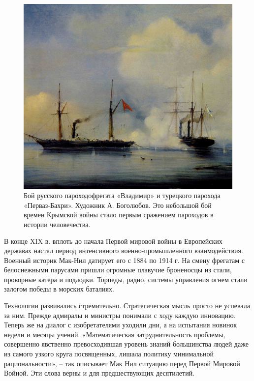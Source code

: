 \begin{figure}[h!tb] 
	\centering\includegraphics[scale=0.3]{Data/RYAV_sily_storon/rO3nWL7-ijc.jpg}
	\caption{Бой русского пароходофрегата «Владимир» и турецкого парохода «Перваз-Бахри». Художник А. Боголюбов. Это небольшой бой времен Крымской войны стало первым сражением пароходов в истории человечества.}%
\end{figure}

В конце XIX в. вплоть до начала Первой мировой войны в Европейских державах настал период интенсивного военно-промышленного взаимодействия. Военный историк Мак-Нил датирует его с 1884 по 1914 г. На смену фрегатам с белоснежными парусами пришли огромные плавучие броненосцы из стали, проворные катера и подлодки. Торпеды, радио, системы управления огнем стали залогом победы в морских баталиях.

Технологии развивались стремительно. Стратегическая мысль просто не успевала за ним. Прежде адмиралы и министры понимали с ходу каждую инновацию. Теперь же на диалог с изобретателями уходили дни, а на испытания новинок недели и месяцы учений. «Математическая затруднительность проблемы, совершенно явственно превосходившая уровень знаний большинства людей даже из самого узкого круга посвященных, лишала политику минимальной рациональности», – так описывает Мак Нил ситуацию перед Первой Мировой Войной. Эти слова верны и для предшествующих десятилетий.




